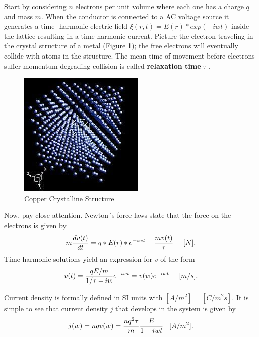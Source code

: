 Start by considering $n$ electrons per unit volume where each one has a charge $q$ and mass $m$. When the conductor is connected to a AC voltage source it generates a time -harmonic electric field $\xi(r,t) = E(r)*exp(-iwt)$ inside the lattice resulting in a time harmonic current. Picture the electron traveling in the crystal structure of a metal (Figure \ref{fig:copper-structure}); the free electrons will eventually collide with atoms in the structure. The mean time of movement before  electrons suffer momentum-degrading collision is called \textbf{relaxation time} $\tau$ \cite{zangwill2013modern}. 
\begin{figure}[H]
    \centering
    \includegraphics[scale = 0.5]{Figures/copper_structure.jpeg}
    \caption{Copper Crystalline Structure}
    \label{fig:copper-structure}
\end{figure}

Now, pay close attention. Newton´s force laws state that the force on the electrons is given by 
\begin{equation}
    m\frac{dv(t)}{dt}= q * E(r)*e^{-iwt} - \frac{mv(t)}{\tau} \hspace{0.5 cm}[N].
\end{equation}
Time harmonic solutions yield an expression for $v$ of the form
\begin{equation}
    v(t) = \frac{qE/m}{1/\tau -iw} e^{-iwt} = v(w)e^{-iwt} \hspace{0.5 cm}[m/s].
\end{equation}

Current density is formally defined in SI units with $[A/m^2]=[C/m^2s]$. It is simple to see that current density $j$ that develops in the system is given by
\begin{equation}
    \label{eq:current density distribution}
    j(w) = nqv(w) = \frac{nq^2 \tau}{m}\frac{E}{1-iwt} \hspace{0.3 cm}[A/m^2].
\end{equation}
\\


